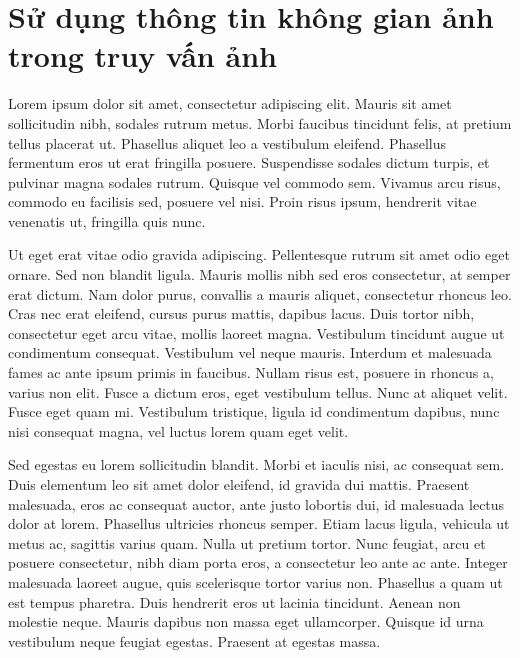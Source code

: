 \section{Sử dụng thông tin không gian ảnh trong truy vấn ảnh}
\label{spatial}
Lorem ipsum dolor sit amet, consectetur adipiscing elit. Mauris sit amet sollicitudin nibh, sodales rutrum metus. Morbi faucibus tincidunt felis, at pretium tellus placerat ut. Phasellus aliquet leo a vestibulum eleifend. Phasellus fermentum eros ut erat fringilla posuere. Suspendisse sodales dictum turpis, et pulvinar magna sodales rutrum. Quisque vel commodo sem. Vivamus arcu risus, commodo eu facilisis sed, posuere vel nisi. Proin risus ipsum, hendrerit vitae venenatis ut, fringilla quis nunc.

Ut eget erat vitae odio gravida adipiscing. Pellentesque rutrum sit amet odio eget ornare. Sed non blandit ligula. Mauris mollis nibh sed eros consectetur, at semper erat dictum. Nam dolor purus, convallis a mauris aliquet, consectetur rhoncus leo. Cras nec erat eleifend, cursus purus mattis, dapibus lacus. Duis tortor nibh, consectetur eget arcu vitae, mollis laoreet magna. Vestibulum tincidunt augue ut condimentum consequat. Vestibulum vel neque mauris. Interdum et malesuada fames ac ante ipsum primis in faucibus. Nullam risus est, posuere in rhoncus a, varius non elit. Fusce a dictum eros, eget vestibulum tellus. Nunc at aliquet velit. Fusce eget quam mi. Vestibulum tristique, ligula id condimentum dapibus, nunc nisi consequat magna, vel luctus lorem quam eget velit.

Sed egestas eu lorem sollicitudin blandit. Morbi et iaculis nisi, ac consequat sem. Duis elementum leo sit amet dolor eleifend, id gravida dui mattis. Praesent malesuada, eros ac consequat auctor, ante justo lobortis dui, id malesuada lectus dolor at lorem. Phasellus ultricies rhoncus semper. Etiam lacus ligula, vehicula ut metus ac, sagittis varius quam. Nulla ut pretium tortor. Nunc feugiat, arcu et posuere consectetur, nibh diam porta eros, a consectetur leo ante ac ante. Integer malesuada laoreet augue, quis scelerisque tortor varius non. Phasellus a quam ut est tempus pharetra. Duis hendrerit eros ut lacinia tincidunt. Aenean non molestie neque. Mauris dapibus non massa eget ullamcorper. Quisque id urna vestibulum neque feugiat egestas. Praesent at egestas massa.

